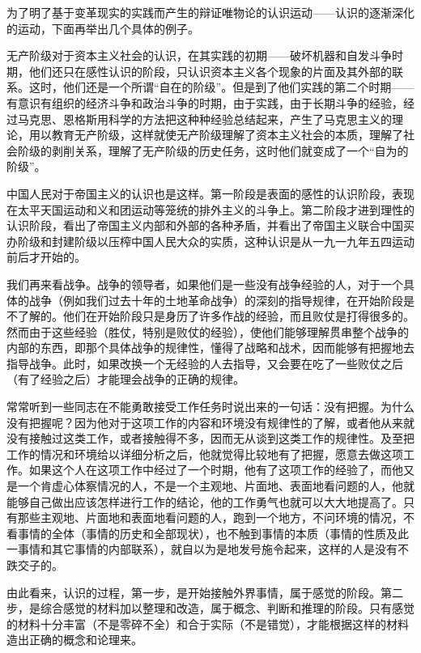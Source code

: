 为了明了基于变革现实的实践而产生的辩证唯物论的认识运动——认识的逐渐深化的运动，下面再举出几个具体的例子。

无产阶级对于资本主义社会的认识，在其实践的初期——破坏机器和自发斗争时期，他们还只在感性认识的阶段，只认识资本主义各个现象的片面及其外部的联系。这时，他们还是一个所谓“自在的阶级”。但是到了他们实践的第二个时期——有意识有组织的经济斗争和政治斗争的时期，由于实践，由于长期斗争的经验，经过马克思、恩格斯用科学的方法把这种种经验总结起来，产生了马克思主义的理论，用以教育无产阶级，这样就使无产阶级理解了资本主义社会的本质，理解了社会阶级的剥削关系，理解了无产阶级的历史任务，这时他们就变成了一个“自为的阶级”。

中国人民对于帝国主义的认识也是这样。第一阶段是表面的感性的认识阶段，表现在太平天国运动和义和团运动等笼统的排外主义的斗争上。第二阶段才进到理性的认识阶段，看出了帝国主义内部和外部的各种矛盾，并看出了帝国主义联合中国买办阶级和封建阶级以压榨中国人民大众的实质，这种认识是从一九一九年五四运动前后才开始的。

我们再来看战争。战争的领导者，如果他们是一些没有战争经验的人，对于一个具体的战争（例如我们过去十年的土地革命战争）的深刻的指导规律，在开始阶段是不了解的。他们在开始阶段只是身历了许多作战的经验，而且败仗是打得很多的。然而由于这些经验（胜仗，特别是败仗的经验），使他们能够理解贯串整个战争的内部的东西，即那个具体战争的规律性，懂得了战略和战术，因而能够有把握地去指导战争。此时，如果改换一个无经验的人去指导，又会要在吃了一些败仗之后（有了经验之后）才能理会战争的正确的规律。

常常听到一些同志在不能勇敢接受工作任务时说出来的一句话：没有把握。为什么没有把握呢？因为他对于这项工作的内容和环境没有规律性的了解，或者他从来就没有接触过这类工作，或者接触得不多，因而无从谈到这类工作的规律性。及至把工作的情况和环境给以详细分析之后，他就觉得比较地有了把握，愿意去做这项工作。如果这个人在这项工作中经过了一个时期，他有了这项工作的经验了，而他又是一个肯虚心体察情况的人，不是一个主观地、片面地、表面地看问题的人，他就能够自己做出应该怎样进行工作的结论，他的工作勇气也就可以大大地提高了。只有那些主观地、片面地和表面地看问题的人，跑到一个地方，不问环境的情况，不看事情的全体（事情的历史和全部现状），也不触到事情的本质（事情的性质及此一事情和其它事情的内部联系），就自以为是地发号施令起来，这样的人是没有不跌交子的。

由此看来，认识的过程，第一步，是开始接触外界事情，属于感觉的阶段。第二步，是综合感觉的材料加以整理和改造，属于概念、判断和推理的阶段。只有感觉的材料十分丰富（不是零碎不全）和合于实际（不是错觉），才能根据这样的材料造出正确的概念和论理来。

